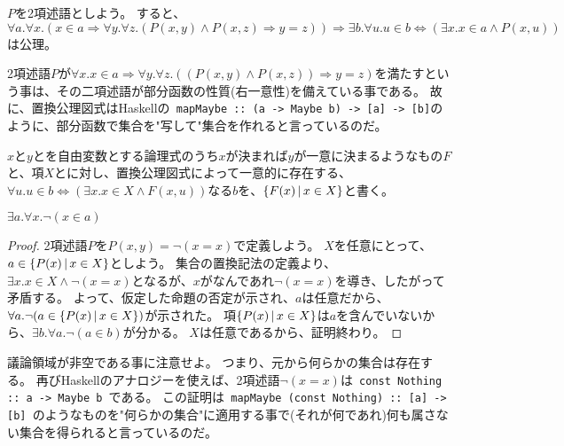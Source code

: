 \documentclass[uplatex,papersize,dvipdfmx]{jsarticle}
\begin{document}
    \begin{axiom}
      $P$を2項述語としよう。
      すると、$\forall a. \forall x. (x \in a \Rightarrow \forall y. \forall z. (P(x, y) \land P(x, z) \Rightarrow y = z))
      \Rightarrow \exists b. \forall u. u \in b \Leftrightarrow (\exists x. x \in a \land P(x, u))$は公理。
      \begin{note}
        2項述語$P$が$\forall x. x \in a \Rightarrow \forall y. \forall z. ((P(x, y) \land P(x, z)) \Rightarrow y = z)$を満たすという事は、その二項述語が部分函数の性質(右一意性)を備えている事である。
        故に、置換公理図式はHaskellの\verb| mapMaybe :: (a -> Maybe b) -> [a] -> [b]|のように、部分函数で集合を"写して"集合を作れると言っているのだ。
      \end{note}
    \end{axiom}
    \begin{definition}[集合の置換記法]
      $x$と$y$とを自由変数とする論理式のうち$x$が決まれば$y$が一意に決まるようなもの$F$と、項$X$とに対し、置換公理図式によって一意的に存在する、$\forall u. u \in b \Leftrightarrow (\exists x. x \in X \land F(x, u))$なる$b$を、$\{ F(x) \, | \, x \in X \}$と書く。
    \end{definition}
    \begin{theorem}
      $\exists a. \forall x. \lnot(x \in a)$
      \begin{proof}
        2項述語$P$を$P(x, y) = \lnot(x = x)$で定義しよう。
        $X$を任意にとって、$a \in \{ P(x) \, | \, x \in X \}$としよう。
        集合の置換記法の定義より、$\exists x. x \in X \land \lnot(x = x)$となるが、$x$がなんであれ$\lnot(x = x)$を導き、したがって矛盾する。
        よって、仮定した命題の否定が示され、$a$は任意だから、$\forall a. \lnot (a \in \{ P(x) \, | \, x \in X \})$が示された。
        項$\{ P(x) \, | \, x \in X \}$は$a$を含んでいないから、$\exists b. \forall a. \lnot (a \in b)$が分かる。
        $X$は任意であるから、証明終わり。
      \end{proof}
      \begin{note}
        議論領域が非空である事に注意せよ。
        つまり、元から何らかの集合は存在する。
        再びHaskellのアナロジーを使えば、2項述語$\lnot(x = x)$は\verb+ const Nothing :: a -> Maybe b +である。
        この証明は\verb| mapMaybe (const Nothing) :: [a] -> [b] |のようなものを"何らかの集合"に適用する事で(それが何であれ)何も属さない集合を得られると言っているのだ。
      \end{note}
    \end{theorem}
\end{document}
